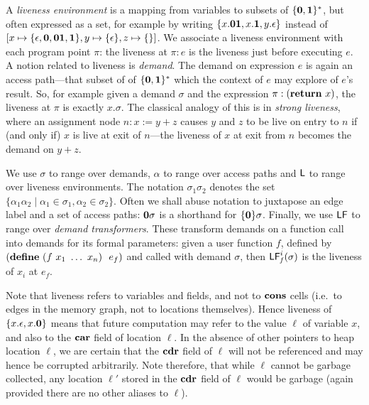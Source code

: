 \documentclass[10pt]{sigplanconf}
\begin{document}
A {\em liveness environment} is a mapping from variables to subsets of
$\{\mathbf{0},\mathbf{1}\}^\ast$, but  often expressed as a set,  for example by
writing  $\{x.\mathbf{0}\mathbf{1},   x.\mathbf{1},  y.\epsilon\}$  instead   of  $[x
  \mapsto\{\epsilon,\mathbf{0},\mathbf{0}\mathbf{1},\mathbf{1}\},     y\mapsto\{\epsilon\},
  z\mapsto\{\}]$.   We  associate  a  liveness environment  with  each
program  point $\pi$:  the liveness  at $\pi:e$  is the  liveness just
before executing $e$.
A  notion  related  to  liveness  is {\em  demand}.   The  demand on
expression  $e$   is  again  an   access  path---that  subset   of  of
$\{\mathbf{0},\mathbf{1}\}^\ast$ which  the context of $e$ may  explore of $e$'s
result.  So,  for example given  a demand $\sigma$ and  the expression
$\pi: (\mbox{$\mathbf{ return}$}\ x)$, the liveness at $\pi$ is exactly $x.\sigma$.  The
classical  analogy of  this  is  in {\em  strong  liveness}, where  an
assignment node $n: x:=y+z$ causes $y$  and $z$ to be live on entry to
$n$ if (and only if) $x$ is  live at exit of $n$---the liveness of $x$
at exit from $n$ becomes the demand on $y+z$.


We use $\sigma$  to range over demands, $\alpha$  to range over access
paths  and $\mathsf{L}$  to range  over liveness  environments.  The notation
$\sigma_1\sigma_2$  denotes  the  set $\lbrace  \alpha_1\alpha_2  \mid
\alpha_1 \in  \sigma_1, \alpha_2 \in \sigma_2\rbrace$.  Often we shall
abuse notation to  juxtapose an edge label and a  set of access paths:
$\mathbf{0}\sigma$   is   a   shorthand  for   $\lbrace\mathbf{0}\rbrace\sigma$.
Finally,  we use $\mathsf{LF}$  to range  over {\em  demand transformers}.
These transform demands on a function call into demands for its formal
parameters:    given    a    user    function    $f$,    defined    by
$(\DEFINE\  (f\ x_1\  \ldots\ x_n)\  \  e_f)$ and  called with  demand
$\sigma$, then $\mathsf{LF}_{\mathit f}^{i}( {\mathit \sigma})$ is the liveness of $x_i$ at $e_f$.

Note that liveness refers to  variables and fields, and not to $\mbox{$\mathbf{cons}$}$
cells  (i.e.\  to  edges  in   the  memory  graph,  not  to  locations
themselves).   Hence liveness  of $\{x.\epsilon,x.\mathbf{0}\}$  means that
future computation may refer to  the value $\ell$ of variable $x$, and
also to the $\mbox{$\mathbf{car}$}$ field of  location $\ell$.  In the absence of other
pointers to heap location $\ell$, we are certain that the $\mbox{$\mathbf{cdr}$}$ field
of  $\ell$  will  not  be   referenced  and  may  hence  be  corrupted
arbitrarily.   Note therefore,  that  while $\ell$  cannot be  garbage
collected, any location  $\ell'$ stored in the $\mbox{$\mathbf{cdr}$}$  field of $\ell$
would  be  garbage (again  provided  there  are  no other  aliases  to
$\ell$).
\end{document}
